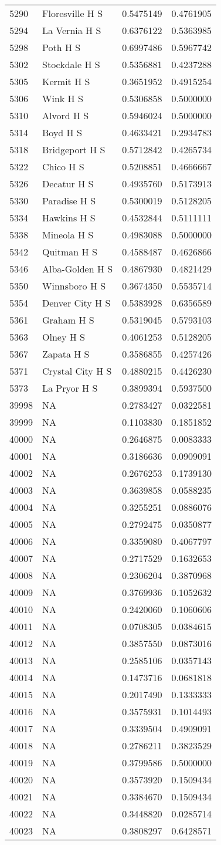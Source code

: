 \documentclass[
]{article}
\begin{document}
\begin{longtable}[]{@{}llrr@{}}
5290 & Floresville H S & 0.5475149 & 0.4761905\tabularnewline
5294 & La Vernia H S & 0.6376122 & 0.5363985\tabularnewline
5298 & Poth H S & 0.6997486 & 0.5967742\tabularnewline
5302 & Stockdale H S & 0.5356881 & 0.4237288\tabularnewline
5305 & Kermit H S & 0.3651952 & 0.4915254\tabularnewline
5306 & Wink H S & 0.5306858 & 0.5000000\tabularnewline
5310 & Alvord H S & 0.5946024 & 0.5000000\tabularnewline
5314 & Boyd H S & 0.4633421 & 0.2934783\tabularnewline
5318 & Bridgeport H S & 0.5712842 & 0.4265734\tabularnewline
5322 & Chico H S & 0.5208851 & 0.4666667\tabularnewline
5326 & Decatur H S & 0.4935760 & 0.5173913\tabularnewline
5330 & Paradise H S & 0.5300019 & 0.5128205\tabularnewline
5334 & Hawkins H S & 0.4532844 & 0.5111111\tabularnewline
5338 & Mineola H S & 0.4983088 & 0.5000000\tabularnewline
5342 & Quitman H S & 0.4588487 & 0.4626866\tabularnewline
5346 & Alba-Golden H S & 0.4867930 & 0.4821429\tabularnewline
5350 & Winnsboro H S & 0.3674350 & 0.5535714\tabularnewline
5354 & Denver City H S & 0.5383928 & 0.6356589\tabularnewline
5361 & Graham H S & 0.5319045 & 0.5793103\tabularnewline
5363 & Olney H S & 0.4061253 & 0.5128205\tabularnewline
5367 & Zapata H S & 0.3586855 & 0.4257426\tabularnewline
5371 & Crystal City H S & 0.4880215 & 0.4426230\tabularnewline
5373 & La Pryor H S & 0.3899394 & 0.5937500\tabularnewline
39998 & NA & 0.2783427 & 0.0322581\tabularnewline
39999 & NA & 0.1103830 & 0.1851852\tabularnewline
40000 & NA & 0.2646875 & 0.0083333\tabularnewline
40001 & NA & 0.3186636 & 0.0909091\tabularnewline
40002 & NA & 0.2676253 & 0.1739130\tabularnewline
40003 & NA & 0.3639858 & 0.0588235\tabularnewline
40004 & NA & 0.3255251 & 0.0886076\tabularnewline
40005 & NA & 0.2792475 & 0.0350877\tabularnewline
40006 & NA & 0.3359080 & 0.4067797\tabularnewline
40007 & NA & 0.2717529 & 0.1632653\tabularnewline
40008 & NA & 0.2306204 & 0.3870968\tabularnewline
40009 & NA & 0.3769936 & 0.1052632\tabularnewline
40010 & NA & 0.2420060 & 0.1060606\tabularnewline
40011 & NA & 0.0708305 & 0.0384615\tabularnewline
40012 & NA & 0.3857550 & 0.0873016\tabularnewline
40013 & NA & 0.2585106 & 0.0357143\tabularnewline
40014 & NA & 0.1473716 & 0.0681818\tabularnewline
40015 & NA & 0.2017490 & 0.1333333\tabularnewline
40016 & NA & 0.3575931 & 0.1014493\tabularnewline
40017 & NA & 0.3339504 & 0.4909091\tabularnewline
40018 & NA & 0.2786211 & 0.3823529\tabularnewline
40019 & NA & 0.3799586 & 0.5000000\tabularnewline
40020 & NA & 0.3573920 & 0.1509434\tabularnewline
40021 & NA & 0.3384670 & 0.1509434\tabularnewline
40022 & NA & 0.3448820 & 0.0285714\tabularnewline
40023 & NA & 0.3808297 & 0.6428571\tabularnewline

\end{longtable}
\end{document}

